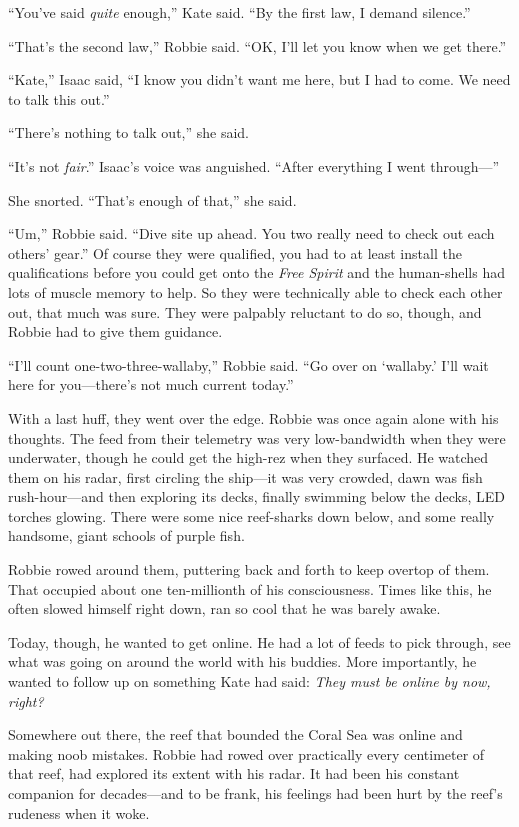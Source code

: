 “You’ve said \emph{quite} enough,” Kate said. “By the first law, I
demand silence.”

“That’s the second law,” Robbie said. “OK, I’ll let you know when
we get there.”

“Kate,” Isaac said, “I know you didn’t want me here, but I had to
come. We need to talk this out.”

“There’s nothing to talk out,” she said.

“It’s not \emph{fair}.” Isaac’s voice was anguished. “After
everything I went through—”

She snorted. “That’s enough of that,” she said.

“Um,” Robbie said. “Dive site up ahead. You two really need to
check out each others’ gear.” Of course they were qualified, you
had to at least install the qualifications before you could get
onto the \emph{Free Spirit} and the human-shells had lots of muscle
memory to help. So they were technically able to check each other
out, that much was sure. They were palpably reluctant to do so,
though, and Robbie had to give them guidance.

“I’ll count one-two-three-wallaby,” Robbie said. “Go over on
‘wallaby.’ I’ll wait here for you—there’s not much current today.”

With a last huff, they went over the edge. Robbie was once again
alone with his thoughts. The feed from their telemetry was very
low-bandwidth when they were underwater, though he could get the
high-rez when they surfaced. He watched them on his radar, first
circling the ship—it was very crowded, dawn was fish rush-hour—and
then exploring its decks, finally swimming below the decks, LED
torches glowing. There were some nice reef-sharks down below, and
some really handsome, giant schools of purple fish.

Robbie rowed around them, puttering back and forth to keep overtop
of them. That occupied about one ten-millionth of his
consciousness. Times like this, he often slowed himself right down,
ran so cool that he was barely awake.

Today, though, he wanted to get online. He had a lot of feeds to
pick through, see what was going on around the world with his
buddies. More importantly, he wanted to follow up on something Kate
had said: \emph{They must be online by now, right?}

Somewhere out there, the reef that bounded the Coral Sea was online
and making noob mistakes. Robbie had rowed over practically every
centimeter of that reef, had explored its extent with his radar. It
had been his constant companion for decades—and to be frank, his
feelings had been hurt by the reef’s rudeness when it woke.


